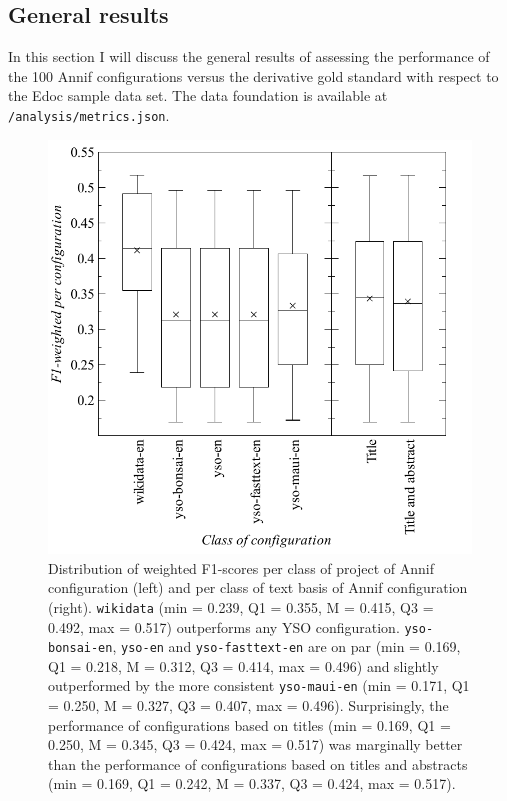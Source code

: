 \hypertarget{general-results}{%
\subsection{General results}\label{general-results}}

In this section I will discuss the general results of assessing the
performance of the 100 Annif configurations versus the derivative gold
standard with respect to the Edoc sample data set. The data foundation
is available at \texttt{/analysis/metrics.json}.

\begin{figure}
\centering
\includegraphics{images/metrics_all_project+abstract.pdf}
\caption{Distribution of weighted F1-scores per class of project of
Annif configuration (left) and per class of text basis of Annif
configuration (right). \texttt{wikidata} (min = 0.239, Q1 = 0.355, M =
0.415, Q3 = 0.492, max = 0.517) outperforms any YSO configuration.
\texttt{yso-bonsai-en}, \texttt{yso-en} and \texttt{yso-fasttext-en} are
on par (min = 0.169, Q1 = 0.218, M = 0.312, Q3 = 0.414, max = 0.496) and
slightly outperformed by the more consistent \texttt{yso-maui-en} (min =
0.171, Q1 = 0.250, M = 0.327, Q3 = 0.407, max = 0.496). Surprisingly,
the performance of configurations based on titles (min = 0.169, Q1 =
0.250, M = 0.345, Q3 = 0.424, max = 0.517) was marginally better than
the performance of configurations based on titles and abstracts (min =
0.169, Q1 = 0.242, M = 0.337, Q3 = 0.424, max = 0.517).}
\end{figure}

